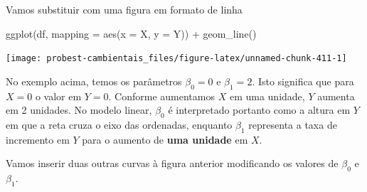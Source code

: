 \documentclass[
]{book}
\newenvironment{Shaded}{\begin{snugshade}}{\end{snugshade}}
\newcommand{\AttributeTok}[1]{\textcolor[rgb]{0.77,0.63,0.00}{#1}}
\newcommand{\FunctionTok}[1]{\textcolor[rgb]{0.00,0.00,0.00}{#1}}
\newcommand{\NormalTok}[1]{#1}
\newcommand{\SpecialCharTok}[1]{\textcolor[rgb]{0.00,0.00,0.00}{#1}}
\begin{document}
Vamos substituir com uma figura em formato de linha

\begin{Shaded}
\begin{Highlighting}[]
\FunctionTok{ggplot}\NormalTok{(df, }\AttributeTok{mapping =} \FunctionTok{aes}\NormalTok{(}\AttributeTok{x =}\NormalTok{ X, }\AttributeTok{y =}\NormalTok{ Y)) }\SpecialCharTok{+}
  \FunctionTok{geom\_line}\NormalTok{()}
\end{Highlighting}
\end{Shaded}

\begin{center}\texttt{[image: probest-cambientais\_files/figure-latex/unnamed-chunk-411-1]} \end{center}

No exemplo acima, temos os parâmetros \(\beta_0 = 0\) e \(\beta_1 = 2\). Isto significa que para \(X = 0\) o valor em \(Y = 0\). Conforme aumentamos \(X\) em uma unidade, \(Y\) aumenta em 2 unidades. No modelo linear, \(\beta_0\) é interpretado portanto como a altura em \(Y\) em que a reta cruza o eixo das ordenadas, enquanto \(\beta_1\) representa a taxa de incremento em \(Y\) para o aumento de \textbf{uma unidade} em \(X\).

Vamos inserir duas outras curvas à figura anterior modificando os valores de \(\beta_0\) e \(\beta_1\).
\end{document}

